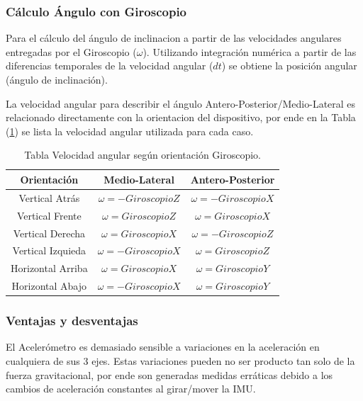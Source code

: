 \documentclass[12pt,a4paper]{article}
\begin{document}
\subsubsection{Cálculo Ángulo con Giroscopio}
Para el cálculo del ángulo de inclinacion a partir de las velocidades angulares entregadas por el Giroscopio ($\omega$). Utilizando integración numérica a partir de las diferencias temporales de la velocidad angular ($dt$) se obtiene la posición angular (ángulo de inclinación).

La velocidad angular para describir el ángulo Antero-Posterior/Medio-Lateral es relacionado directamente con la orientacion del dispositivo, por ende en la Tabla (\ref{table:calculoAnguloGiroscopio}) se lista la velocidad angular utilizada para cada caso.



\begin{table}[H]
	\centering
	\begin{tabular}{|c|c|c|}
		\hline 
		\textbf{Orientación} & \textbf{Medio-Lateral} & \textbf{Antero-Posterior} \\ 
		\hline 
		Vertical Atrás & $\omega= -GiroscopioZ$ &  $\omega= -GiroscopioX$ \\ 
		\hline 
		Vertical Frente & $\omega= GiroscopioZ$ &  $\omega= GiroscopioX$ \\
		\hline 
		Vertical Derecha & $\omega= GiroscopioX$ &  $\omega= -GiroscopioZ$ \\ 
		\hline 
		Vertical Izquieda & $\omega= -GiroscopioX$ &  $\omega= GiroscopioZ$ \\ 
		\hline 
		Horizontal Arriba & $\omega= GiroscopioX$ &  $\omega= GiroscopioY$ \\ 
		\hline 
		Horizontal Abajo & $\omega= -GiroscopioX$ &  $\omega= GiroscopioY$ \\ 
		\hline 
	\end{tabular}
	\caption{Tabla Velocidad angular según orientación Giroscopio.} 
	\label{table:calculoAnguloGiroscopio}
\end{table}



\subsubsection{Ventajas y desventajas}

El Acelerómetro es demasiado sensible a variaciones en la aceleración en cualquiera de sus 3 ejes. Estas variaciones pueden no ser producto tan solo de la fuerza gravitacional, por ende son generadas medidas erráticas debido a los cambios de aceleración constantes al girar/mover la IMU.
\end{document}

